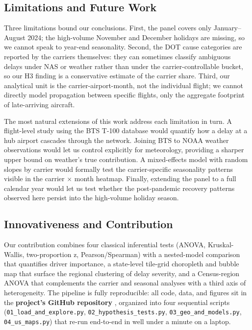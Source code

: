 \documentclass[12pt,letterpaper]{article}
\begin{document}
\subsection{Limitations and Future Work}
Three limitations bound our conclusions. First, the panel covers only
January--August 2024; the high-volume November and December holidays
are missing, so we cannot speak to year-end seasonality. Second, the
DOT cause categories are reported by the carriers themselves: they can
sometimes classify ambiguous delays under NAS or weather rather than
under the carrier-controllable bucket, so our H3 finding is a
conservative estimate of the carrier share. Third, our analytical unit
is the carrier-airport-month, not the individual flight; we cannot
directly model propagation between specific flights, only the
aggregate footprint of late-arriving aircraft.

The most natural extensions of this work address each limitation in
turn. A flight-level study using the BTS T-100 database would
quantify how a delay at a hub airport cascades through the network.
Joining BTS to NOAA weather observations would let us control
explicitly for meteorology, providing a sharper upper bound on
weather's true contribution. A mixed-effects model with random slopes
by carrier would formally test the carrier-specific seasonality
patterns visible in the carrier $\times$ month heatmap. Finally,
extending the panel to a full calendar year would let us test whether
the post-pandemic recovery patterns observed here persist into the
high-volume holiday season.

\subsection{Innovativeness and Contribution}
Our contribution combines four classical inferential tests (ANOVA,
Kruskal-Wallis, two-proportion z, Pearson/Spearman) with a nested-model
comparison that quantifies driver importance, a state-level tile-grid
choropleth and bubble map that surface the regional clustering of
delay severity, and a Census-region ANOVA that complements the carrier
and seasonal analyses with a third axis of heterogeneity. The pipeline
is fully reproducible: all code, data, and figures sit in the
\textbf{project's GitHub repository} \citep{team8repo}, organized into four sequential scripts
(\texttt{01\_load\_and\_explore.py}, \texttt{02\_hypothesis\_tests.py},
\texttt{03\_geo\_and\_models.py}, \texttt{04\_us\_maps.py}) that re-run
end-to-end in well under a minute on a laptop.

\newpage


{\small
\setlength{\bibsep}{2pt}

}
\end{document}
